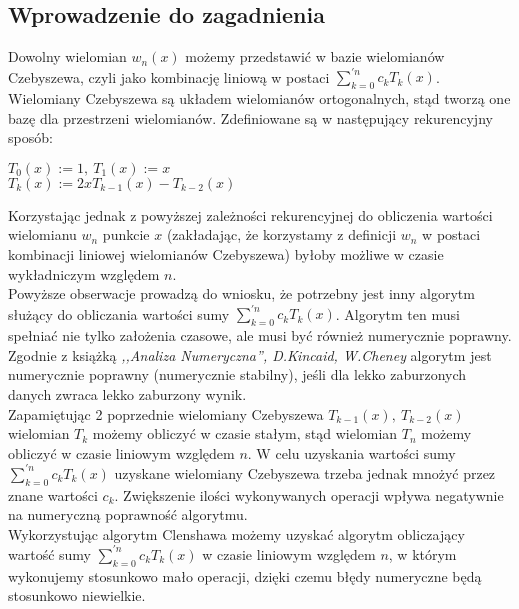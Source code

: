 \documentclass[10pt]{article}
\begin{document}
\subsection{Wprowadzenie do zagadnienia}
Dowolny wielomian $w_{n}(x)$ możemy przedstawić w bazie wielomianów Czebyszewa, czyli jako kombinację liniową w postaci $\sum_{k=0}^{'n} c_{k} T_{k}(x)$. \\
Wielomiany Czebyszewa są układem wielomianów ortogonalnych, stąd tworzą one bazę dla przestrzeni wielomianów. Zdefiniowane są w następujący rekurencyjny sposób:
\begin{center}
$T_{0}(x) := 1, \: T_{1}(x) := x$ \\
\vspace{0.2em} $T_{k}(x) := 2x T_{k-1}(x) - T_{k-2}(x)$
\end{center}
Korzystając jednak z powyższej zależności rekurencyjnej do obliczenia wartości wielomianu $w_{n}$ punkcie $x$ (zakładając, że korzystamy z definicji $w_{n}$ w postaci kombinacji liniowej wielomianów Czebyszewa) byłoby możliwe w czasie wykładniczym względem $n$. \\
Powyższe obserwacje prowadzą do wniosku, że potrzebny jest inny algorytm służący do obliczania wartości sumy $\sum_{k=0}^{'n} c_{k} T_{k}(x)$. Algorytm ten musi spełniać nie tylko założenia czasowe, ale musi być również numerycznie poprawny. \\ 

Zgodnie z książką \textit{,,Analiza Numeryczna'', D.Kincaid, W.Cheney} algorytm jest numerycznie poprawny (numerycznie stabilny), jeśli dla lekko zaburzonych danych zwraca lekko zaburzony wynik. \\

Zapamiętując 2 poprzednie wielomiany Czebyszewa $T_{k-1}(x), \: T_{k-2}(x)$ wielomian $T_{k}$ możemy obliczyć w czasie stałym, stąd wielomian $T_{n}$ możemy obliczyć w czasie liniowym względem $n$. W celu uzyskania wartości sumy $\sum_{k=0}^{'n} c_{k} T_{k}(x)$ uzyskane wielomiany Czebyszewa trzeba jednak mnożyć przez znane wartości $c_{k}$. Zwiększenie ilości wykonywanych operacji wpływa negatywnie na numeryczną poprawność algorytmu. \\
Wykorzystując algorytm Clenshawa możemy uzyskać algorytm obliczający wartość sumy $\sum_{k=0}^{'n} c_{k} T_{k}(x)$ w czasie liniowym względem $n$, w którym wykonujemy stosunkowo mało operacji, dzięki czemu błędy numeryczne będą stosunkowo niewielkie.
\end{document}
